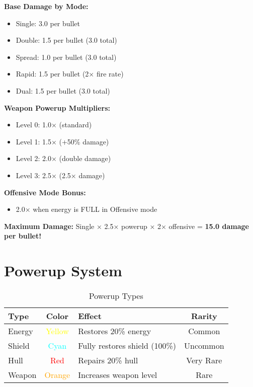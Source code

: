 \documentclass[11pt,a4paper]{article}
\begin{document}
\textbf{Base Damage by Mode:}
\begin{itemize}
    \item Single: 3.0 per bullet
    \item Double: 1.5 per bullet (3.0 total)
    \item Spread: 1.0 per bullet (3.0 total)
    \item Rapid: 1.5 per bullet (2× fire rate)
    \item Dual: 1.5 per bullet (3.0 total)
\end{itemize}

\textbf{Weapon Powerup Multipliers:}
\begin{itemize}
    \item Level 0: 1.0× (standard)
    \item Level 1: 1.5× (+50\% damage)
    \item Level 2: 2.0× (double damage)
    \item Level 3: 2.5× (2.5× damage)
\end{itemize}

\textbf{Offensive Mode Bonus:}
\begin{itemize}
    \item 2.0× when energy is FULL in Offensive mode
\end{itemize}

\textbf{Maximum Damage:} Single × 2.5× powerup × 2× offensive = \textbf{15.0 damage per bullet!}

\section{Powerup System}

\begin{table}[h]
\centering
\begin{tabularx}{\textwidth}{|l|c|X|c|}
\hline
\rowcolor{primarycolor!20}
\textbf{Type} & \textbf{Color} & \textbf{Effect} & \textbf{Rarity} \\
\hline
Energy & \textcolor{yellow}{Yellow} & Restores 20\% energy & Common \\
\hline
Shield & \textcolor{cyan}{Cyan} & Fully restores shield (100\%) & Uncommon \\
\hline
Hull & \textcolor{red}{Red} & Repairs 20\% hull & Very Rare \\
\hline
Weapon & \textcolor{orange}{Orange} & Increases weapon level & Rare \\
\hline
\end{tabularx}
\caption{Powerup Types}
\end{table}
\end{document}
